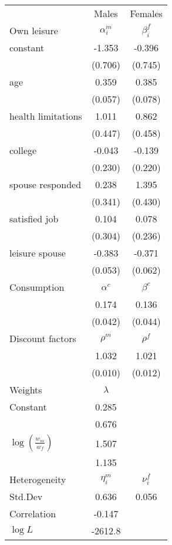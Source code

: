 \begin{tabular}{lcc} 
\hline\hline 
 & Males & Females \\ 
Own leisure & $\alpha_{i}^{m}$ & $\beta_{i}^{f}$ \\ 
constant & -1.353 & -0.396 \\ 
 & (0.706) & (0.745) \\ 
age & 0.359 & 0.385 \\ 
 & (0.057) & (0.078) \\ 
health limitations & 1.011 & 0.862 \\ 
 & (0.447) & (0.458) \\ 
college & -0.043 & -0.139 \\ 
 & (0.230) & (0.220) \\ 
spouse responded & 0.238 & 1.395 \\ 
 & (0.341) & (0.430) \\ 
satisfied job & 0.104 & 0.078 \\ 
 & (0.304) & (0.236) \\ 
leisure spouse & -0.383 & -0.371 \\ 
 & (0.053) & (0.062) \\ 
Consumption & $\alpha^{c}$ & $\beta^{c}$ \\ 
 & 0.174 & 0.136 \\ 
 & (0.042) & (0.044) \\ 
Discount factors & $\rho^m$ & $\rho^f$ \\ 
 & 1.032 & 1.021 \\ 
 & (0.010) & (0.012) \\ 
Weights & $\lambda$ &  \\ 
Constant & 0.285 &  \\ 
 & 0.676 &  \\ 
$\log(\frac{w_m}{w_f})$ & 1.507 &  \\ 
 & 1.135 &  \\ 
Heterogeneity & $\eta_i^m$ & $\nu_i^f$ \\ 
Std.Dev & 0.636 & 0.056 \\ 
Correlation & -0.147 &  \\ 
\hline 
$\log L$ & -2612.8 & \\ 
\hline \hline 
\end{tabular} 
